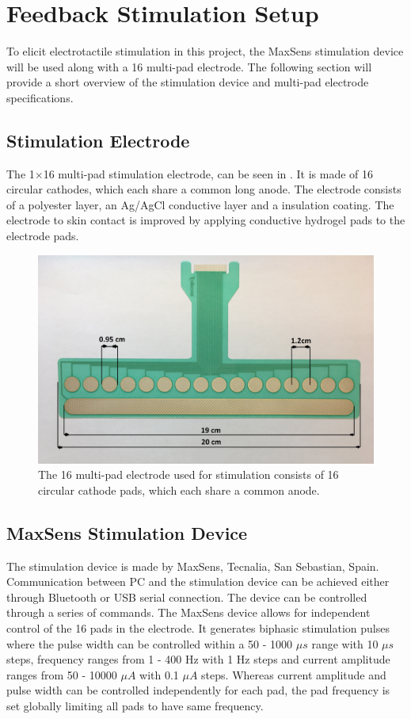 \section{Feedback Stimulation Setup} \label{Maxxx}

To elicit electrotactile stimulation in this project, the MaxSens stimulation device will be used along with a 16 multi-pad electrode. The following section will provide a short overview of the stimulation device and multi-pad electrode specifications. 
 

\subsection{Stimulation Electrode}

The 1$\times$16 multi-pad stimulation electrode, can be seen in . It is made of 16 circular cathodes, which each share a common long anode. The electrode consists of a polyester layer, an Ag/AgCl conductive layer and a insulation coating. The electrode to skin contact is improved by applying conductive hydrogel pads to the electrode pads. \cite{Strbac2016}     

\begin{figure}[H]                 
	\includegraphics[width=.57\textwidth]{figures/electrode}  
	\caption{The 16 multi-pad electrode used for stimulation consists of 16 circular cathode pads, which each share a common anode.}
	\label{fig:electrode} 
\end{figure}

\subsection{MaxSens Stimulation Device}

The stimulation device is made by MaxSens, Tecnalia, San Sebastian, Spain. Communication between PC and the stimulation device can be achieved either through Bluetooth or USB serial connection. The device can be controlled through a series of commands. The MaxSens device allows for independent control of the 16 pads in the electrode. It generates biphasic stimulation pulses where the pulse width can be controlled within a 50 - 1000 $\mu s$ range with 10 $\mu s$ steps, frequency ranges from 1 - 400 Hz with 1 Hz steps and current amplitude ranges from 50 - 10000 $\mu A$ with 0.1 $\mu A$ steps. Whereas current amplitude and pulse width can be controlled independently for each pad, the pad frequency is set globally limiting all pads to have same frequency.    